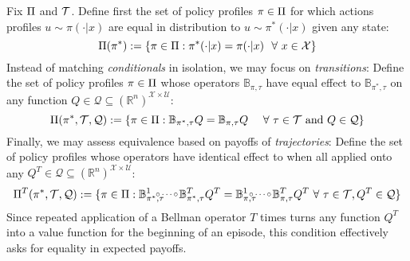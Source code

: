 \begin{redefinition}[restate=defequivalence,name=Representational Equivalence]\upshape\label{def:equivalence}
Fix $\Pi$ and $\mathcal{T}$. Define first the set of policy profiles $\pi\in\Pi$ for which actions profiles $u\sim\pi(\cdot|x)$ are equal in distribution to $u\sim\pi^{*}(\cdot|x)$ given any state:
%
\begin{equation}
\Pi(\pi^{*})
:=
\{
\pi\in\Pi
:
\pi^{*}(\cdot|x)=\pi(\cdot|x)
~~
\forall
~
x\in\mathcal{X}
\}
\label{eqn:conditionals}
\end{equation}
%
Instead of matching \textit{conditionals} in isolation,
we may focus on \textit{transitions}:
Define the set of policy profiles $\pi\in\Pi$ whose operators $\mathbb{B}_{\pi,\tau}$ have equal effect to $\mathbb{B}_{\pi^{*},\tau}$ on any function $Q\in\mathcal{Q}\subseteq(\mathbb{R}^{n})^{\mathcal{X}\times\mathcal{U}}$:
%
\begin{equation}
\Pi(\pi^{*},\mathcal{T},\mathcal{Q})
:=
\{
\pi\in\Pi
:
\mathbb{B}_{\pi^{*},\tau}Q
=
\mathbb{B}_{\pi,\tau}Q
~~~~
\forall
~
\tau\in\mathcal{T}
~
\text{and}
~
Q\in\mathcal{Q}
\}
\label{eqn:transitions}
\end{equation}
%
Finally, we may assess equivalence based on payoffs of \textit{trajectories}:
Define the set of policy profiles whose operators  have identical effect to  when all applied onto any $Q^{T}\in\mathcal{Q}\subseteq(\mathbb{R}^{n})^{\mathcal{X}\times\mathcal{U}}$:
%
\begin{equation}
\Pie^{T}(\pi^{*},\Tau,\mathcal{Q})
:=
\{
\pi\in\Pie
:
\mathbb{B}_{\pi^{*},\tau}^{1}
\hspace{-8pt}\raisebox{1pt}{\scalebox{0.8}{$\circ\dots\circ$}}\hspace{1pt}
\mathbb{B}_{\pi^{*},\tau}^{T}Q^{T}
=
\mathbb{B}_{\pi,\tau}^{1}
\hspace{-7pt}\raisebox{1pt}{\scalebox{0.8}{$\circ\dots\circ$}}\hspace{1pt}
\mathbb{B}_{\pi,\tau}^{T}Q^{T}
~
\forall
~
\tau\in\Tau,
Q^{T}\in\mathcal{Q}
\}
\label{eqn:trajectories}
\end{equation}
%
Since repeated application of a Bellman operator $T$ times turns any function $Q^{T}$ into a value function for the beginning of an episode, this condition effectively asks for equality in expected payoffs.
%
\EOD
\end{redefinition}

